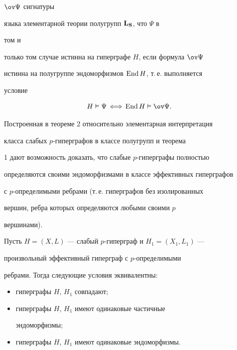 \begin{thm}
\begin{itemize}
$\ov\Psi$ сигнатуры 


языка элементарной теории полугрупп $\bold L_{\bold S}$, что $\Psi$ в 


том и 


только том случае истинна на гиперграфе $H$, если формула $\ov\Psi$ 


истинна на полугруппе эндоморфизмов $\operatorname{End} H$, т.\,е. выполняется 


условие 


$$ 


H\vDash\Psi\,\Longleftrightarrow\,\End H\vDash\ov\Psi. 


$$ 


\end{itemize} 


\end{thm} 


 


Построенная в теореме 2 относительно элементарная интерпретация 


класса слабых $p$-гиперграфов в классе полугрупп и теорема 


1 дают возможность доказать, что слабые $p$-гиперграфы полностью 


определяются своими эндоморфизмами в классе эффективных гиперграфов 


с $p$-определимыми ребрами (т.\,е. гиперграфов без изолированных 


вершин, ребра которых определяются любыми своими $p$ 


вершинами). 


 


\begin{prop} 


Пусть $H=(X,L)$ --- слабый $p$-гиперграф и $H_1=(X_1,L_1)$ --- 


произвольный эффективный гиперграф с $p$-определимыми 


ребрами. Тогда следующие условия эквива\-лентны$:$ 


\begin{itemize} 


\item[1)] гиперграфы $H$, $H_1$ совпадают$;$ 


\item[2)] гиперграфы $H$, $H_1$ имеют одинаковые частичные 


эндоморфизмы$;$ 


\item[3)] гиперграфы $H$, $H_1$ имеют одинаковые эндоморфизмы. 


\end{itemize} 


\end{prop} 


